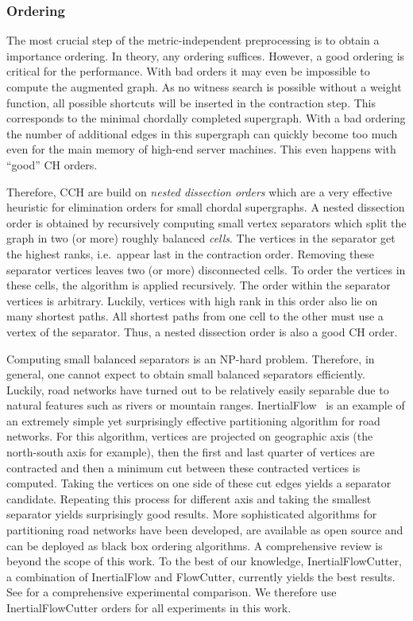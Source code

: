 \documentclass[a4paper, english, cleveref]{lipics-v2021}
\begin{document}
\subsubsection{Ordering}

The most crucial step of the metric-independent preprocessing is to obtain a importance ordering.
In theory, any ordering suffices.
However, a good ordering is critical for the performance.
With bad orders it may even be impossible to compute the augmented graph.
As no witness search is possible without a weight function, all possible shortcuts will be inserted in the contraction step.
This corresponds to the minimal chordally completed supergraph.
With a bad ordering the number of additional edges in this supergraph can quickly become too much even for the main memory of high-end server machines.
This even happens with ``good'' CH orders.

Therefore, CCH are build on \emph{nested dissection orders} which are a very effective heuristic for elimination orders for small chordal supergraphs.
A nested dissection order is obtained by recursively computing small vertex separators which split the graph in two (or more) roughly balanced \emph{cells}.
The vertices in the separator get the highest ranks, i.e.\ appear last in the contraction order.
Removing these separator vertices leaves two (or more) disconnected cells.
To order the vertices in these cells, the algorithm is applied recursively.
The order within the separator vertices is arbitrary.
Luckily, vertices with high rank in this order also lie on many shortest paths.
All shortest paths from one cell to the other must use a vertex of the separator.
Thus, a nested dissection order is also a good CH order.

Computing small balanced separators is an \textsf{NP}-hard problem.
Therefore, in general, one cannot expect to obtain small balanced separators efficiently.
Luckily, road networks have turned out to be relatively easily separable due to natural features such as rivers or mountain ranges.
InertialFlow~\cite{TODO} is an example of an extremely simple yet surprisingly effective partitioning algorithm for road networks.
For this algorithm, vertices are projected on geographic axis (the north-south axis for example), then the first and last quarter of vertices are contracted and then a minimum cut between these contracted vertices is computed.
Taking the vertices on one side of these cut edges yields a separator candidate.
Repeating this process for different axis and taking the smallest separator yields surprisingly good results.
More sophisticated algorithms for partitioning road networks have been developed, are available as open source and can be deployed as black box ordering algorithms.
A comprehensive review is beyond the scope of this work.
To the best of our knowledge, InertialFlowCutter, a combination of InertialFlow and FlowCutter, currently yields the best results.
See for a comprehensive experimental comparison.
We therefore use InertialFlowCutter orders for all experiments in this work.
\end{document}
